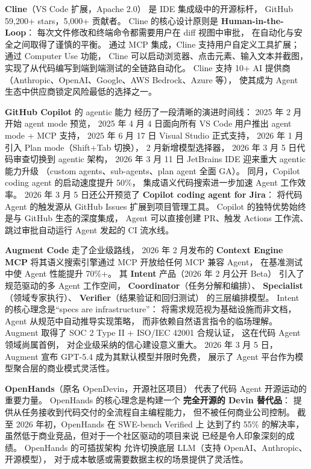 \textbf{Cline}（VS Code 扩展，Apache 2.0）
是 IDE 集成级中的开源标杆，
GitHub 59,200+ stars，5,000+ 贡献者。
Cline 的核心设计原则是 \textbf{Human-in-the-Loop}：
每次文件修改和终端命令都需要用户在 diff 视图中审批，
在自动化与安全之间取得了谨慎的平衡。
通过 MCP 集成，Cline 支持用户自定义工具扩展；
通过 Computer Use 功能，
Cline 可以启动浏览器、点击元素、输入文本并截图，
实现了从代码编写到端到端测试的全链路自动化。
Cline 支持 10+ AI 提供商
（Anthropic、OpenAI、Google、AWS Bedrock、Azure 等），
使其成为 Agent 生态中供应商锁定风险最低的选择之一。

\textbf{GitHub Copilot} 的 agentic 能力
经历了一段清晰的演进时间线：
2025 年 2 月开始 agent mode 预览，
2025 年 4 月 4 日面向所有 VS Code 用户推出
agent mode + MCP 支持，
2025 年 6 月 17 日 Visual Studio 正式支持，
2026 年 1 月引入 Plan mode（Shift+Tab 切换），
2 月新增模型选择器，
2026 年 3 月 5 日代码审查切换到 agentic 架构，
2026 年 3 月 11 日 JetBrains IDE 迎来重大 agentic 能力升级
（custom agents、sub-agents、plan agent 全面 GA）。
同月，Copilot coding agent 的启动速度提升 50\%，
集成语义代码搜索进一步加速 Agent 工作效率。
2026 年 3 月 5 日还公开预览了
\textbf{Copilot coding agent for Jira}：
将代码 Agent 的触发源从 GitHub Issues 扩展到项目管理工具。
Copilot 的独特优势始终是与 GitHub 生态的深度集成，
Agent 可以直接创建 PR、触发 Actions 工作流、
跳过审批自动运行 Agent 发起的 CI 流水线。

\textbf{Augment Code} 走了企业级路线，
2026 年 2 月发布的 \textbf{Context Engine MCP}
将其语义搜索引擎通过 MCP 开放给任何 MCP 兼容 Agent，
在基准测试中使 Agent 性能提升 70\%+。
其 \textbf{Intent} 产品（2026 年 2 月公开 Beta）
引入了规范驱动的多 Agent 工作空间，
\textbf{Coordinator}（任务分解和编排）、
\textbf{Specialist}（领域专家执行）、
\textbf{Verifier}（结果验证和回归测试）
的三层编排模型。
Intent 的核心理念是“specs are infrastructure”：
将需求规范视为基础设施而非文档，
Agent 从规范中自动推导实现策略，
而非依赖自然语言指令的临场理解。
Augment 取得了 SOC 2 Type II + ISO/IEC 42001 合规认证，
这在代码 Agent 领域尚属首例，
对企业级采纳的信心建设意义重大。
2026 年 3 月 5 日，Augment 宣布 GPT-5.4
成为其默认模型并限时免费，
展示了 Agent 平台作为模型聚合层的商业模式灵活性。

\textbf{OpenHands}（原名 OpenDevin，开源社区项目）
代表了代码 Agent 开源运动的重要力量。
OpenHands 的核心理念是构建一个
\textbf{完全开源的 Devin 替代品}：
提供从任务接收到代码交付的全流程自主编程能力，
但不被任何商业公司控制。
截至 2026 年初，OpenHands 在 SWE-bench Verified 上
达到了约 55\% 的解决率，
虽然低于商业竞品，但对于一个社区驱动的项目来说
已经是令人印象深刻的成绩。
OpenHands 的可插拔架构
允许切换底层 LLM（支持 OpenAI、Anthropic、开源模型），
对于成本敏感或需要数据主权的场景提供了灵活性。

